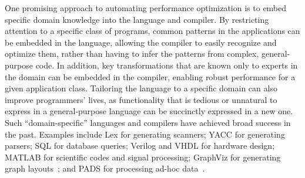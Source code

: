 
One promising approach to automating performance optimization is to
embed specific domain knowledge into the language and compiler.  By
restricting attention to a specific class of programs, common patterns
in the applications can be embedded in the language, allowing the
compiler to easily recognize and optimize them, rather than having to
infer the patterns from complex, general-purpose code.  In addition,
key transformations that are known only to experts in the domain can
be embedded in the compiler, enabling robust performance for a given
application class.  Tailoring the language to a specific domain can
also improve programmers' lives, as functionality that is tedious or
unnatural to express in a general-purpose language can be succinctly
expressed in a new one.  Such ``domain-specific'' languages and
compilers have achieved broad success in the past.  Examples include
Lex for generating scanners; YACC for generating parsers; SQL for
database queries; Verilog and VHDL for hardware design; MATLAB for
scientific codes and signal processing; GraphViz for generating graph
layouts~\cite{ellson_graphviz_2002}; and PADS for processing ad-hoc
data~\cite{fisher_pads:domain-specific_2005}.


